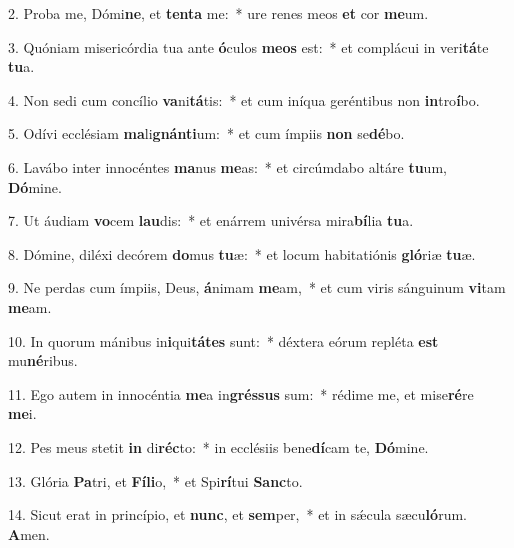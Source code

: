 2. Proba me, Dómi\textbf{ne}, et \textbf{ten}\textbf{ta} me:~*  ure renes meos \textbf{et} cor \textbf{me}um.\

3. Quóniam misericórdia tua ante \textbf{ó}culos \textbf{me}\textbf{os} est:~*  et complácui in veri\textbf{tá}te \textbf{tu}a.\

4. Non sedi cum concílio \textbf{va}ni\textbf{tá}tis:~*  et cum iníqua geréntibus non \textbf{in}tro\textbf{í}bo.\

5. Odívi ecclésiam \textbf{ma}li\textbf{gnán}\textbf{ti}um:~*  et cum ímpiis \textbf{non} se\textbf{dé}bo.\

6. Lavábo inter innocéntes \textbf{ma}nus \textbf{me}as:~*  et circúmdabo altáre \textbf{tu}um, \textbf{Dó}mine.\

7. Ut áudiam \textbf{vo}cem \textbf{lau}dis:~*  et enárrem univérsa mira\textbf{bí}lia \textbf{tu}a.\

8. Dómine, diléxi decórem \textbf{do}mus \textbf{tu}æ:~*  et locum habitatiónis \textbf{gló}riæ \textbf{tu}æ.\

9. Ne perdas cum ímpiis, Deus, \textbf{á}nimam \textbf{me}am,~*  et cum viris sánguinum \textbf{vi}tam \textbf{me}am.\

10. In quorum mánibus in\textbf{i}qui\textbf{tá}\textbf{tes} sunt:~*  déxtera eórum repléta \textbf{est} mu\textbf{né}ribus.\

11. Ego autem in innocéntia \textbf{me}a in\textbf{grés}\textbf{sus} sum:~*  rédime me, et mise\textbf{ré}re \textbf{me}i.\

12. Pes meus stetit \textbf{in} di\textbf{réc}to:~*  in ecclésiis bene\textbf{dí}cam te, \textbf{Dó}mine.\

13. Glória \textbf{Pa}tri, et \textbf{Fí}\textbf{li}o,~*  et Spi\textbf{rí}tui \textbf{Sanc}to.\

14. Sicut erat in princípio, et \textbf{nunc}, et \textbf{sem}per,~*  et in sǽcula sæcu\textbf{ló}rum. \textbf{A}men.\

